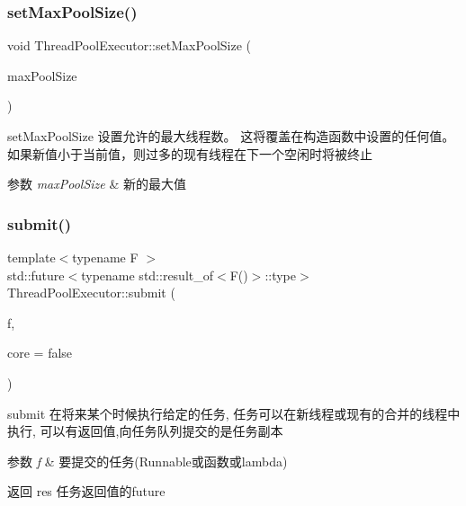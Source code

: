 \subsubsection{\texorpdfstring{set\+Max\+Pool\+Size()}{setMaxPoolSize()}}
{\footnotesize\ttfamily void Thread\+Pool\+Executor\+::set\+Max\+Pool\+Size (\begin{DoxyParamCaption}\item[{int}]{max\+Pool\+Size }\end{DoxyParamCaption})}



set\+Max\+Pool\+Size 设置允许的最大线程数。 这将覆盖在构造函数中设置的任何值。 如果新值小于当前值，则过多的现有线程在下一个空闲时将被终止 


\begin{DoxyParams}{参数}
{\em max\+Pool\+Size} & 新的最大值 \\
\hline
\end{DoxyParams}
\mbox{\label{classThreadPoolExecutor_aaaef92fe45f7f5a8b659187c15881ca3}} 
\subsubsection{\texorpdfstring{submit()}{submit()}}
{\footnotesize\ttfamily template$<$typename F $>$ \\
std\+::future$<$typename std\+::result\+\_\+of$<$F()$>$\+::type$>$ Thread\+Pool\+Executor\+::submit (\begin{DoxyParamCaption}\item[{F}]{f,  }\item[{bool}]{core = {\ttfamily false} }\end{DoxyParamCaption})\hspace{0.3cm}{\ttfamily [inline]}}



submit 在将来某个时候执行给定的任务, 任务可以在新线程或现有的合并的线程中执行, 可以有返回值,向任务队列提交的是任务副本 


\begin{DoxyParams}{参数}
{\em f} & 要提交的任务(Runnable或函数或lambda)\\
\hline
\end{DoxyParams}
\begin{DoxyReturn}{返回}
res 任务返回值的future 
\end{DoxyReturn}
\mbox{\label{classThreadPoolExecutor_af85a124c9169a546bfbd725725024527}} 

